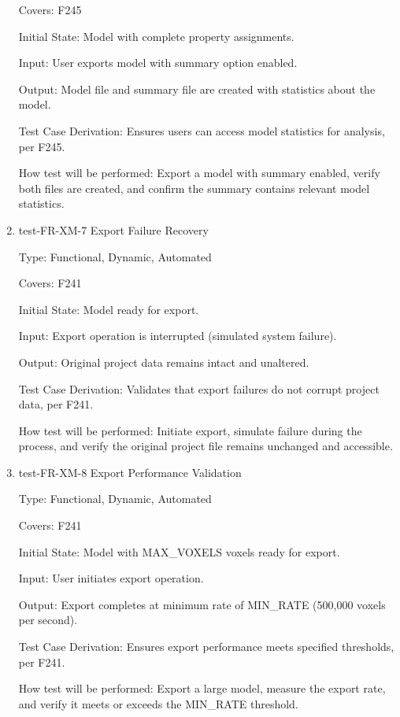 \documentclass[12pt, titlepage]{article}
\begin{document}
\begin{enumerate}
Covers: F245
					
Initial State: Model with complete property assignments.
					
Input: User exports model with summary option enabled.
					
Output: Model file and summary file are created with statistics about the model.

Test Case Derivation: Ensures users can access model statistics for analysis, per F245.
					
How test will be performed: Export a model with summary enabled, verify both files are created, and confirm the summary contains relevant model statistics.

\item{test-FR-XM-7 Export Failure Recovery\\}

Type: Functional, Dynamic, Automated

Covers: F241
					
Initial State: Model ready for export.
					
Input: Export operation is interrupted (simulated system failure).
					
Output: Original project data remains intact and unaltered.

Test Case Derivation: Validates that export failures do not corrupt project data, per F241.
					
How test will be performed: Initiate export, simulate failure during the process, and verify the original project file remains unchanged and accessible.

\item{test-FR-XM-8 Export Performance Validation\\}

Type: Functional, Dynamic, Automated

Covers: F241
					
Initial State: Model with MAX\_VOXELS voxels ready for export.
					
Input: User initiates export operation.
					
Output: Export completes at minimum rate of MIN\_RATE (500,000 voxels per second).

Test Case Derivation: Ensures export performance meets specified thresholds, per F241.
					
How test will be performed: Export a large model, measure the export rate, and verify it meets or exceeds the MIN\_RATE threshold.

\end{enumerate}
\end{document}

